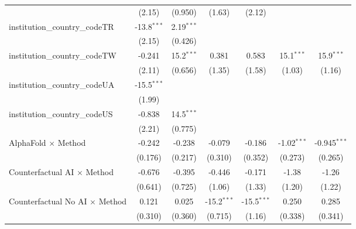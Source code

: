 \begin{tabular}{lcccccc}
                                         & (2.15)        & (0.950)       & (1.63)        & (2.12)        &               &   \\   
   institution\_country\_codeTR          & -13.8$^{***}$ & 2.19$^{***}$  &               &               &               &   \\   
                                         & (2.15)        & (0.426)       &               &               &               &   \\   
   institution\_country\_codeTW          & -0.241        & 15.2$^{***}$  & 0.381         & 0.583         & 15.1$^{***}$  & 15.9$^{***}$\\   
                                         & (2.11)        & (0.656)       & (1.35)        & (1.58)        & (1.03)        & (1.16)\\   
   institution\_country\_codeUA          & -15.5$^{***}$ &               &               &               &               &   \\   
                                         & (1.99)        &               &               &               &               &   \\   
   institution\_country\_codeUS          & -0.838        & 14.5$^{***}$  &               &               &               &   \\   
                                         & (2.21)        & (0.775)       &               &               &               &   \\   
   AlphaFold $\times$ Method             & -0.242        & -0.238        & -0.079        & -0.186        & -1.02$^{***}$ & -0.945$^{***}$\\   
                                         & (0.176)       & (0.217)       & (0.310)       & (0.352)       & (0.273)       & (0.265)\\   
   Counterfactual AI $\times$ Method     & -0.676        & -0.395        & -0.446        & -0.171        & -1.38         & -1.26\\   
                                         & (0.641)       & (0.725)       & (1.06)        & (1.33)        & (1.20)        & (1.22)\\   
   Counterfactual No AI $\times$ Method  & 0.121         & 0.025         & -15.2$^{***}$ & -15.5$^{***}$ & 0.250         & 0.285\\   
                                         & (0.310)       & (0.360)       & (0.715)       & (1.16)        & (0.338)       & (0.341)\\   

\end{tabular}
